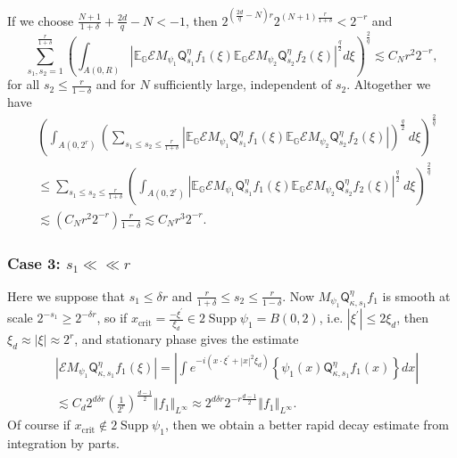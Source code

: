\documentclass{amsart}%
\theoremstyle{plain}
\numberwithin{equation}{section}
\begin{document}
If we choose $\frac{N+1}{1+\delta}+\frac{2d}{q}-N<-1$, then $2^{\left(
\frac{2d}{q}-N\right)  r}2^{\left(  N+1\right)  \frac{r}{1+\delta}}<2^{-r}$
and%
\[
\sum_{s_{1},s_{2}=1}^{\frac{r}{1+\delta}}\left(  \int_{A\left(  0,R\right)
}\left\vert \mathbb{E}_{\mathbb{G}}\mathcal{E}M_{\psi_{1}}\mathsf{Q}_{s_{1}%
}^{\eta}f_{1}\left(  \xi\right)  \mathbb{E}_{\mathbb{G}}\mathcal{E}M_{\psi
_{2}}\mathsf{Q}_{s_{2}}^{\eta}f_{2}\left(  \xi\right)  \right\vert ^{\frac
{q}{2}}d\xi\right)  ^{\frac{2}{q}}\lesssim C_{N}r^{2}2^{-r},
\]
for all $s_{2}\leq\frac{r}{1-\delta}$ and for $N$ sufficiently large,
independent of $s_{2}$. Altogether we have%
\begin{align}
& \left(  \int_{A\left(  0,2^{r}\right)  }\left(  \sum_{s_{1}\leq s_{2}%
\leq\frac{r}{1+\delta}}\left\vert \mathbb{E}_{\mathbb{G}}\mathcal{E}%
M_{\psi_{1}}\mathsf{Q}_{s_{1}}^{\eta}f_{1}\left(  \xi\right)  \mathbb{E}%
_{\mathbb{G}}\mathcal{E}M_{\psi_{2}}\mathsf{Q}_{s_{2}}^{\eta}f_{2}\left(
\xi\right)  \right\vert \right)  ^{\frac{q}{2}}\ d\xi\right)  ^{\frac{2}{q}%
}\label{second half}\\
& \leq\sum_{s_{1}\leq s_{2}\leq\frac{r}{1+\delta}}\left(  \int_{A\left(
0,2^{r}\right)  }\left\vert \mathbb{E}_{\mathbb{G}}\mathcal{E}M_{\psi_{1}%
}\mathsf{Q}_{s_{1}}^{\eta}f_{1}\left(  \xi\right)  \mathbb{E}_{\mathbb{G}%
}\mathcal{E}M_{\psi_{2}}\mathsf{Q}_{s_{2}}^{\eta}f_{2}\left(  \xi\right)
\right\vert ^{\frac{q}{2}}\ d\xi\right)  ^{\frac{2}{q}}\nonumber\\
& \lesssim\left(  C_{N}r^{2}2^{-r}\right)  \frac{r}{1-\delta}\lesssim
C_{N}r^{3}2^{-r}.\nonumber
\end{align}


\subsubsection{Case 3: $s_{1}\ll\ll r$}

Here we suppose that $s_{1}\leq\delta r$ and $\frac{r}{1+\delta}\leq s_{2}%
\leq\frac{r}{1-\delta}$. Now $M_{\psi_{1}}\mathsf{Q}_{\kappa,s_{1}}^{\eta
}f_{1}$ is smooth at scale $2^{-s_{1}}\geq2^{-\delta r}$, so if
$x_{\operatorname*{crit}}=\frac{-\xi^{\prime}}{\xi_{d}}\in
2\operatorname*{Supp}\psi_{1}=B\left(  0,2\right)  $, i.e. $\left\vert
\xi^{\prime}\right\vert \leq2\xi_{d}$, then $\xi_{d}\approx\left\vert
\xi\right\vert \approx2^{r}$, and stationary phase gives the estimate
\begin{align*}
& \left\vert \mathcal{E}M_{\psi_{1}}\mathsf{Q}_{\kappa,s_{1}}^{\eta}%
f_{1}\left(  \xi\right)  \right\vert =\left\vert \int e^{-i\left(  x\cdot
\xi^{\prime}+\left\vert x\right\vert ^{2}\xi_{d}\right)  }\left\{  \psi
_{1}\left(  x\right)  \mathsf{Q}_{\kappa,s_{1}}^{\eta}f_{1}\left(  x\right)
\right\}  dx\right\vert \\
& \lesssim C_{d}2^{d\delta r}\left(  \frac{1}{2^{r}}\right)  ^{\frac{d-1}{2}%
}\left\Vert f_{1}\right\Vert _{L^{\infty}}\approx2^{d\delta r}2^{-r\frac
{d-1}{2}}\left\Vert f_{1}\right\Vert _{L^{\infty}}.
\end{align*}
Of course if $x_{\operatorname*{crit}}\not \in 2\operatorname*{Supp}\psi_{1}$,
then we obtain a better rapid decay estimate from integration by parts.
\end{document}
